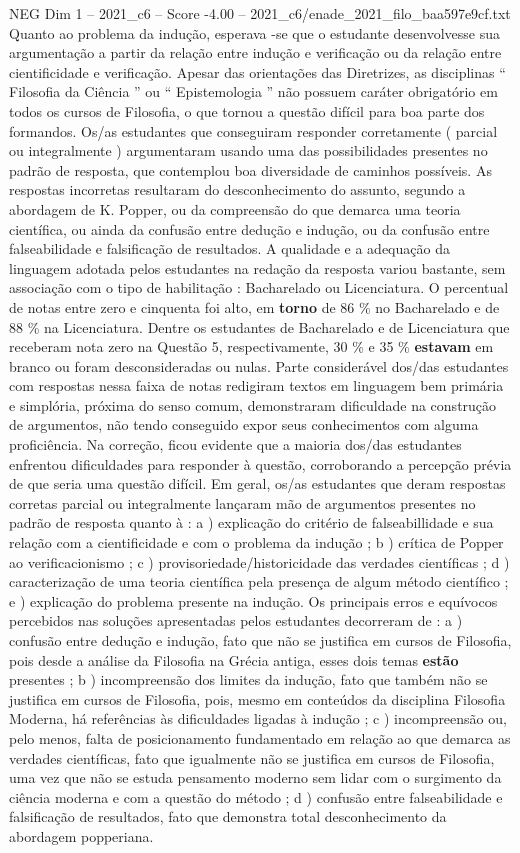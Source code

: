 \begin{textsample}{NEG Dim 1 – 2021\_c6 – Score -4.00 – 2021\_c6/enade\_2021\_filo\_baa597e9cf.txt}
Quanto ao problema da indução, esperava -se que o estudante desenvolvesse sua argumentação a partir da relação entre indução e verificação ou da relação entre cientificidade e verificação.
Apesar das orientações das Diretrizes, as disciplinas “ Filosofia da Ciência ” ou “ Epistemologia ” não possuem caráter obrigatório em todos os cursos de Filosofia, o que tornou a questão difícil para boa parte dos formandos.
Os/as estudantes que conseguiram responder corretamente ( parcial ou integralmente ) argumentaram usando uma das possibilidades presentes no padrão de resposta, que contemplou boa diversidade de caminhos possíveis.
As respostas incorretas resultaram do desconhecimento do assunto, segundo a abordagem de K.
Popper, ou da compreensão do que demarca uma teoria científica, ou ainda da confusão entre dedução e indução, ou da confusão entre falseabilidade e falsificação de resultados.
A qualidade e a adequação da linguagem adotada pelos estudantes na redação da resposta variou bastante, sem associação com o tipo de habilitação : Bacharelado ou Licenciatura.
O percentual de notas entre zero e cinquenta foi alto, em \textbf{torno} de 86 \% no Bacharelado e de 88 \% na Licenciatura.
Dentre os estudantes de Bacharelado e de Licenciatura que receberam nota zero na Questão 5, respectivamente, 30 \% e 35 \% \textbf{estavam} em branco ou foram desconsideradas ou nulas.
Parte considerável dos/das estudantes com respostas nessa faixa de notas redigiram textos em linguagem bem primária e simplória, próxima do senso comum, demonstraram dificuldade na construção de argumentos, não tendo conseguido expor seus conhecimentos com alguma proficiência.
Na correção, ficou evidente que a maioria dos/das estudantes enfrentou dificuldades para responder à questão, corroborando a percepção prévia de que seria uma questão difícil.
Em geral, os/as estudantes que deram respostas corretas parcial ou integralmente lançaram mão de argumentos presentes no padrão de resposta quanto à : a ) explicação do critério de falseabillidade e sua relação com a cientificidade e com o problema da indução ; b ) crítica de Popper ao verificacionismo ; c ) provisoriedade/historicidade das verdades científicas ; d ) caracterização de uma teoria científica pela presença de algum método científico ; e ) explicação do problema presente na indução.
Os principais erros e equívocos percebidos nas soluções apresentadas pelos estudantes decorreram de : a ) confusão entre dedução e indução, fato que não se justifica em cursos de Filosofia, pois desde a análise da Filosofia na Grécia antiga, esses dois temas \textbf{estão} presentes ; b ) incompreensão dos limites da indução, fato que também não se justifica em cursos de Filosofia, pois, mesmo em conteúdos da disciplina Filosofia Moderna, há referências às dificuldades ligadas à indução ; c ) incompreensão ou, pelo menos, falta de posicionamento fundamentado em relação ao que demarca as verdades científicas, fato que igualmente não se justifica em cursos de Filosofia, uma vez que não se estuda pensamento moderno sem lidar com o surgimento da ciência moderna e com a questão do método ; d ) confusão entre falseabilidade e falsificação de resultados, fato que demonstra total desconhecimento da abordagem popperiana.

\end{textsample}
